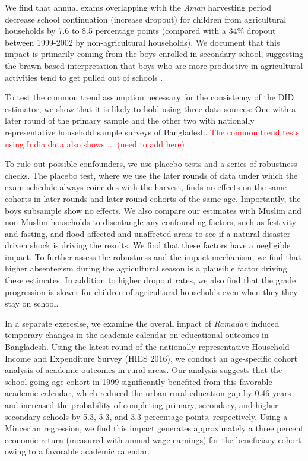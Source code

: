 \documentclass[12pt,letterpaper]{article}
\newcommand{\SAdded}[1]{\textcolor{red}{#1}}
\newcommand{\0}{\ensuremath{\mbox{\boldmath $0$}}}
\begin{document}
We find that annual exams overlapping with the \textit{Aman} harvesting period decrease school continuation (increase dropout) for children from agricultural households by 7.6 to 8.5 percentage points (compared with a 34\% dropout between 1999-2002 by non-agricultural households). We document that this impact is primarily coming from the boys enrolled in secondary school, suggesting the brawn-based interpretation that boys who are more productive in agricultural activities tend to get pulled out of schools \citep{PittRosenzweigHassan2010}. 

To test the common trend assumption necessary for the consistency of the DID estimator, we show that it is likely to hold using three data sources: One with a later round of the primary sample and the other two with nationally representative household sample surveys of Bangladesh. \SAdded{The common trend tests using India data also shows ... (need to add here)}

To rule out possible confounders, we use placebo tests and a series of robustness checks. The placebo test, where we use the later rounds of data under which the exam schedule always coincides with the harvest, finds no effects on the same cohorts in later rounds and later round cohorts of the same age. Importantly, the boys subsample show no effects. We also compare our estimates with Muslim and non-Muslim households to disentangle any confounding factors, such as festivity and fasting, and flood-affected and unaffected areas to see if a natural disaster-driven shock is driving the results. We find that these factors have a negligible impact. To further assess the robustness and the impact mechanism, we find that higher absenteeism during the agricultural season is a plausible factor driving these estimates. In addition to higher dropout rates, we also find that the grade progression is slower for children of agricultural households even when they they stay on school. 

In a separate exercsise, we examine the overall impact of \textit{Ramadan} induced temporary changes in the academic calendar on educational outcomes in Bangladesh. Using the latest round of the nationally-representative Household Income and Expenditure Survey (HIES 2016), we conduct an age-specific cohort analysis of academic outcomes in rural areas. Our analysis suggests that the school-going age cohort in 1999 significantly benefited from this favorable academic calendar, which reduced the urban-rural education gap by 0.46 years and increased the probability of completing primary, secondary, and higher secondary schools by 5.3, 5.3, and 3.3 percentage points, respectively. Using a Mincerian regression, we find this impact generates approximately a three percent economic return (measured with annual wage earnings) for the beneficiary cohort owing to a favorable academic calendar.
\end{document}
